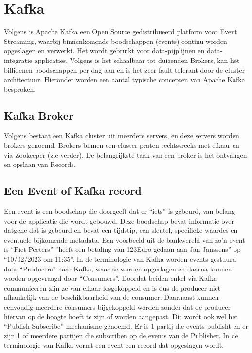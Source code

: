 \section{Kafka}
Volgens \textcite{AwsAmazon2023b} is Apache Kafka een Open Source gedistribueerd platform voor Event Streaming, waarbij binnenkomende boodschappen (events) continu worden opgeslagen en verwerkt. Het wordt gebruikt voor data-pijplijnen en data-integratie applicaties.
Volgens \autocite{ASF2022b} is het schaalbaar tot duizenden Brokers, kan het billioenen boodschappen per dag aan en is het zeer fault-tolerant door de cluster-architectuur. Hieronder worden een aantal typische concepten van Apache Kafka besproken.

\subsection{Kafka Broker}
Volgens \textcite{GitBook2023} bestaat een Kafka cluster uit meerdere servers, en deze servers worden brokers genoemd. Brokers binnen een cluster praten rechtstreeks met elkaar en via Zookeeper (zie verder).
\newline
De belangrijkste taak van een broker is het ontvangen en opslaan van Records.

\subsection{Een Event of Kafka record}
Een event is een boodschap die doorgeeft dat er ``iets'' is gebeurd, van belang voor de applicatie die wordt gebouwd. Deze boodschap bevat informatie over datgene dat is gebeurd en bevat een tijdstip, een sleutel, specifieke waardes en eventuele bijkomende metadata. Een voorbeeld uit de bankwereld van zo'n event is ``Piet Peeters'' ``heeft een betaling van 123Euro gedaan aan Jan Janssens'' op ``10/02/2023 om 11:35''.
\newline
In de terminologie van Kafka worden events gestuurd door ``Producers'' naar Kafka, waar ze worden opgeslagen en daarna kunnen worden opgevraagd door ``Consumers''. Doordat beiden enkel via Kafka communiceren zijn ze van elkaar losgekoppeld en is dus de producer niet afhankelijk van de beschikbaarheid van de consumer.\autocite{Kafka2023}
\newline
Daarnaast kunnen eenvoudig meerdere consumers bijgekoppeld worden zonder dat de producer hiervan op de hoogte hoeft te zijn of worden aangepast.
\newline
Dit wordt ook wel het ``Publish-Subscribe'' mechanisme genoemd. Er is 1 partij die events publisht en er zijn 1 of meerdere partijen die subscriben op de events van de Publisher.
In de terminologie van Kafka vormt een event een record dat opgeslagen wordt.


